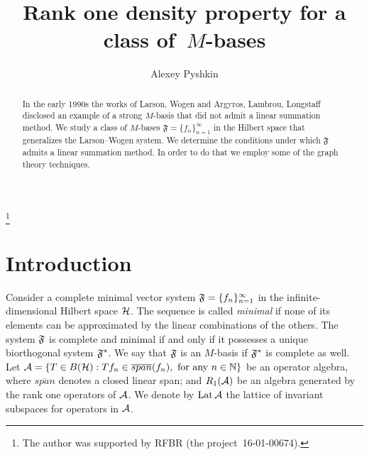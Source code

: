 \documentclass[12pt,oneside,a4paper]{amsart}
\begin{document}
\title{Rank one density property for a class of~$M$-bases}
\author{Alexey Pyshkin}
\begin{abstract}
  In the early 1990s the works of Larson, Wogen and Argyros, Lambrou, Longstaff
    disclosed an example of a strong $M$-basis that did not admit a linear summation method.
  We study a class of $M$-bases $\mathfrak{F}=\{f_n\}_{n=1}^\infty$ in the Hilbert space that
    generalizes the Larson--Wogen system.
  We determine the conditions under which $\mathfrak{F}$ admits a linear summation method.
  In order to do that we employ some of the graph theory techniques.
\end{abstract}
\thanks{The author was supported by RFBR (the project~16-01-00674).}
\maketitle

\section{Introduction}
  Consider a complete minimal vector system $\fsys = \seq{f}$ in the infinite-dimensional Hilbert space $\cal{H}$.
  The sequence is called \emph{minimal} if none of its elements can be approximated by the linear combinations of the others.
  The system $\fsys$ is complete and minimal if and only if it possesses a unique biorthogonal system $\fstarsys$.
  We say that $\fsys$ is an $M$-basis if $\fstarsys$ is complete as well.
  Let ${\cal{A} = \{T\in B(\cal{H}): Tf_n \in \overline{span}(f_n), \text{ for any } n \in \mathbb{N}\}}$ be an operator algebra, where
    $\overline{span}$ denotes a closed linear span;
    and $R_1(\cal{A})$ be an algebra generated by the rank one operators of $\cal{A}$.
  We denote by $\lattice$ the lattice of invariant subspaces for operators in $\cal{A}$.
\end{document}
